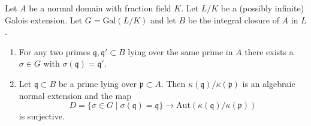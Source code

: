 \begin{lemma}
\label{lemma-one-orbit-geometric-galois}
Let $A$ be a normal domain with fraction field $K$.
Let $L/K$ be a (possibly infinite) Galois extension.
Let $G = \text{Gal}(L/K)$ and let
$B$ be the integral closure of $A$ in $L$.
\begin{enumerate}
\item For any two primes
$\mathfrak q, \mathfrak q' \subset B$ lying over the same prime in $A$
there exists a $\sigma \in G$ with $\sigma(\mathfrak q) = \mathfrak q'$.
\item Let $\mathfrak q \subset B$ be a prime lying over
$\mathfrak p \subset A$. Then $\kappa(\mathfrak q)/\kappa(\mathfrak p)$
is an algebraic normal extension and the map
$$
D = \{\sigma \in G \mid \sigma(\mathfrak q) = \mathfrak q\}
\longrightarrow
\text{Aut}(\kappa(\mathfrak q)/\kappa(\mathfrak p))
$$
is surjective.
\end{enumerate}
\end{lemma}

